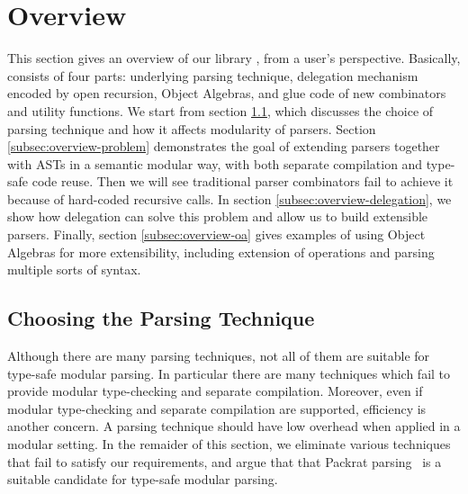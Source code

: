 \section{Overview}\label{sec:overview}

This section gives an overview of our library \name, from a user's perspective. Basically, \name consists of four parts: underlying parsing technique, delegation mechanism encoded by open recursion, Object Algebras, and glue code of new combinators and utility functions. We start from section \ref{subsec:overview-parsing}, which discusses the choice of parsing technique and how it affects modularity of parsers. Section \ref{subsec:overview-problem} demonstrates the goal of extending parsers together with ASTs in a semantic modular way, with both separate compilation and type-safe code reuse. Then we will see traditional parser combinators fail to achieve it because of hard-coded recursive calls. In section \ref{subsec:overview-delegation}, we show how delegation can solve this problem and allow us to build extensible parsers. Finally, section \ref{subsec:overview-oa} gives examples of using Object Algebras for more extensibility, including extension of operations and parsing multiple sorts of syntax.

 


\subsection{Choosing the Parsing Technique}\label{subsec:overview-parsing}


Although there are many parsing techniques, not all of them are
suitable for type-safe modular parsing. In particular there are many
techniques which fail to provide modular type-checking and separate
compilation. Moreover, even if modular type-checking and separate
compilation are supported, efficiency is another
concern. A parsing technique should have low overhead when applied
in a modular setting. In the remaider of this section, we eliminate
various techniques that fail to satisfy our requirements, and argue
that that Packrat parsing~\cite{Ford2002} is a suitable candidate for
type-safe modular parsing.

